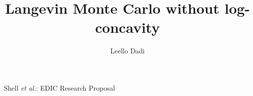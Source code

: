 \documentclass[10pt,journal,a4paper]{IEEEtran}
\theoremstyle{definition}
\begin{document}
%
\title{Langevin Monte Carlo without log-concavity}
\author{Leello Dadi}
%
%
%
% 
%



%
{Shell \MakeLowercase{\textit{et al.}}: EDIC Research Proposal}
% 
\end{document}
